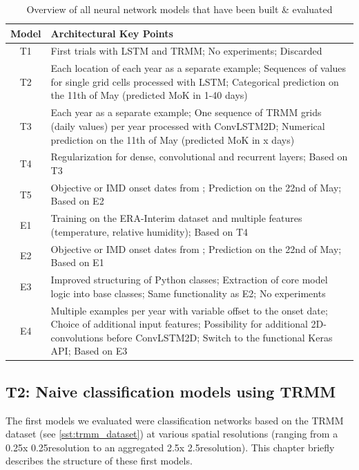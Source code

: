 \begin{table}[h]
  \begin{tabularx}{\linewidth}{|c|X|}
    \hline
    Model & Architectural Key Points \\
    \hline
    T1 & First trials with LSTM and TRMM; No experiments; Discarded \\
    T2 & Each location of each year as a separate example; Sequences of values for single grid cells processed with LSTM; Categorical prediction on the 11th of May (predicted MoK in 1-40 days) \\
    T3 & Each year as a separate example; One sequence of TRMM grids (daily values) per year processed with ConvLSTM2D; Numerical prediction on the 11th of May (predicted MoK in x days) \\
    T4 & Regularization for dense, convolutional and recurrent layers; Based on T3 \\
    T5 & Objective or IMD onset dates from \citep{Singh.2009}; Prediction on the 22nd of May; Based on E2 \\
    \hline
    E1 & Training on the ERA-Interim dataset and multiple features (temperature, relative humidity); Based on T4 \\
    E2 & Objective or IMD onset dates from \citep{Singh.2009}; Prediction on the 22nd of May; Based on E1 \\
    E3 & Improved structuring of Python classes; Extraction of core model logic into base classes; Same functionality as E2; No experiments \\
    E4 & Multiple examples per year with variable offset to the onset date; Choice of additional input features; Possibility for additional 2D-convolutions before ConvLSTM2D; Switch to the functional Keras API; Based on E3 \\
    \hline
  \end{tabularx}
  \caption{Overview of all neural network models that have been built \& evaluated}
  \label{tab:nn_overall_summary}
\end{table}



\newpage
\subsection{T2: Naive classification models using TRMM}
\label{sst:nn_t2}
The first models we evaluated were classification networks based on the TRMM dataset (see \cref{sst:trmm_dataset}) at various spatial resolutions (ranging from a 0.25\degree x 0.25\degree resolution to an aggregated 2.5\degree x 2.5\degree resolution). This chapter briefly describes the structure of these first models.

